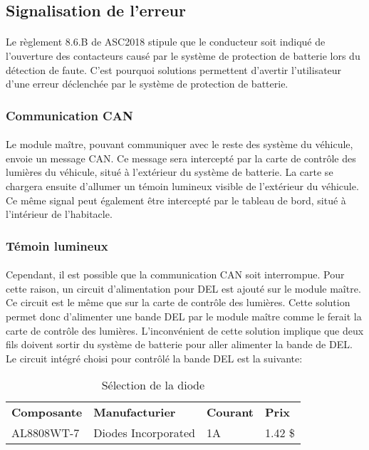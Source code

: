 
\subsection{Signalisation de l'erreur}

	\paragraph*{}
	Le règlement 8.6.B de ASC2018\cite{ASC2018} stipule que le conducteur soit indiqué de l'ouverture des contacteurs causé par le système de protection de batterie lors du détection de faute. C'est pourquoi solutions permettent d'avertir l'utilisateur d'une erreur déclenchée par le système de protection de batterie. 
	
	\subsubsection{Communication CAN}
		\paragraph*{}
		Le module maître, pouvant communiquer avec le reste des système du véhicule, envoie un message CAN. Ce message sera intercepté par la carte de contrôle des lumières du véhicule, situé à l'extérieur du système de batterie. La carte se chargera ensuite d'allumer un témoin lumineux visible de l'extérieur du véhicule. Ce même signal peut également être intercepté par le tableau de bord, situé à l'intérieur de l'habitacle.
		
	\subsubsection{Témoin lumineux}
		\paragraph*{}
		Cependant, il est possible que la communication CAN soit interrompue. Pour cette raison, un circuit d'alimentation pour DEL est ajouté sur le module maître. Ce circuit est le même que sur la carte de contrôle des lumières. Cette solution permet donc d'alimenter une bande DEL par le module maître comme le ferait la carte de contrôle des lumières. L'inconvénient de cette solution implique que deux fils doivent sortir du système de batterie pour aller alimenter la bande de DEL. Le circuit intégré choisi pour contrôlé la bande DEL est la suivante:
	
	\begin{table}[H]
		\centering
		\caption{Sélection de la diode}
		\label{DiodePrecharge}
		\begin{tabular}{|p{3cm}|p{4cm}|p{2cm}|p{1.5cm}|}
			\hline
			\textbf{Composante} & \textbf{Manufacturier} & \textbf{Courant} & \textbf{Prix}
			\\ \hhline{|=|=|=|=|}
			AL8808WT-7 & Diodes Incorporated  & 1A & 1.42 \$ \\ \hline		
		\end{tabular}
	\end{table}		

